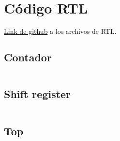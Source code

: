 \section{Código RTL}

\href{https://github.com/msebgarcia/DDA2024/tree/main/Lab01/rtl}{Link de github} a los archivos de RTL.

\subsection{Contador}
\inputminted[fontsize=\footnotesize]{systemverilog}{../rtl/counter.sv}

\newpage
\subsection{Shift register}
\inputminted[fontsize=\footnotesize]{systemverilog}{../rtl/shiftreg.sv}

\newpage
\subsection{Top}
\inputminted[fontsize=\footnotesize]{systemverilog}{../rtl/shiftleds.sv}

